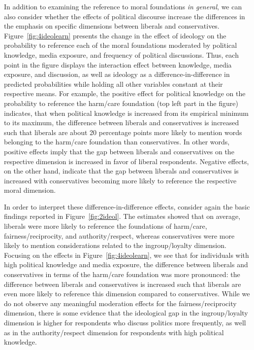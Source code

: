 \documentclass[12pt]{article}
\begin{document}
In addition to examining the reference to moral foundations \textit{in general}, we can also consider whether the effects of political discourse increase the differences in the emphasis on specific dimensions between liberals and conservatives. Figure~\ref{fig:4ideolearn} presents the change in the effect of ideology on the probability to reference each of the moral foundations moderated by political knowledge, media exposure, and frequency of political discussions. Thus, each point in the figure displays the interaction effect between knowledge, media exposure, and discussion, as well as ideology as a difference-in-difference in predicted probabilities while holding all other variables constant at their respective means. For example, the positive effect for political knowledge on the probability to reference the harm/care foundation (top left part in the figure) indicates, that when political knowledge is increased from its empirical minimum to its maximum, the difference between liberals and conservatives is increased such that liberals are about 20 percentage points more likely to mention words belonging to the harm/care foundation than conservatives. In other words, positive effects imply that the gap between liberals and conservatives on the respective dimension is increased in favor of liberal respondents. Negative effects, on the other hand, indicate that the gap between liberals and conservatives is increased with conservatives becoming more likely to reference the respective moral dimension.

In order to interpret these difference-in-difference effects, consider again the basic findings reported in Figure~\ref{fig:2ideol}. The estimates showed that on average, liberals were more likely to reference the foundations of harm/care, fairness/reciprocity, and authority/respect, whereas conservatives were more likely to mention considerations related to the ingroup/loyalty dimension. Focusing on the effects in Figure~\ref{fig:4ideolearn}, we see that for individuals with high political knowledge and media exposure, the difference between liberals and conservatives in terms of the harm/care foundation was more pronounced: the difference between liberals and conservatives is increased such that liberals are even more likely to reference this dimension compared to conservatives. While we do not observe any meaningful moderation effects for the fairness/reciprocity dimension, there is some evidence that the ideological gap in the ingroup/loyalty dimension is higher for respondents who discuss politics more frequently, as well as in the authority/respect dimension for respondents with high political knowledge.
\end{document}

